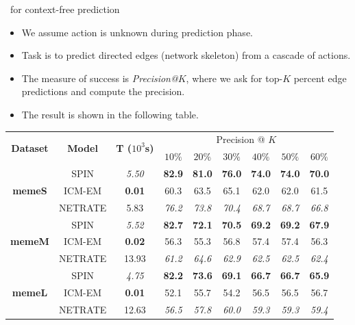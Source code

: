 \documentclass[first=dgreen,second=purple,logo=yellowexc]{aaltoslides}
\begin{document}
\begin{frame}{\spin\ for context-free prediction}
	\begin{itemize}
		\item We assume action is unknown during prediction phase.
		\item Task is to predict directed edges (network skeleton) from a cascade of actions.
		\item The measure of success is {\em Precision@$K$}, where we ask for top-$K$ percent edge predictions and compute the precision.
		\item The result is shown in the following table.
	\end{itemize}
			\begin{table}[t]
			\scriptsize
			\centering
			\begin{tabular}{|@{  }c@{  }|@{  }c@{  }|@{  }c@{  }|@{  }c@{  }|@{  }c@{  }|@{  }c@{  }|@{  }c@{  }|@{  }c@{  }|@{  }c@{  }|}
			  \hline
			\multirow{2}{*}{\textbf{Dataset}} & \multirow{2}{*}{\textbf{Model}} & \multirow{2}{*}{\textbf{T ({\tiny$10^3$s})}} & \multicolumn{6}{c|}{Precision @ $K$} \\ \cline{4-9}
			 & & & {$10\%$} & {$20\%$} & {$30\%$} & {$40\%$} & {$50\%$} & {$60\%$} \\ \hline
			\multirow{3}{*}{\textbf{memeS}}
			& SPIN & \em{5.50} & \textbf{82.9} & \textbf{81.0} & \textbf{76.0} & \textbf{74.0} & \textbf{74.0} & \textbf{70.0}  \\  
			& ICM-EM & \textbf{0.01} & {60.3} & {63.5} & {65.1} & {62.0} & {62.0} & {61.5}  \\ 
			& NETRATE & {5.83} & \em{76.2} & \em{73.8} & \em{70.4} & \em{68.7} & \em{68.7} & \em{66.8} \\ \hline 
			\multirow{3}{*}{\textbf{memeM}}
			& SPIN & \em{5.52} & \textbf{82.7} & \textbf{72.1} & \textbf{70.5} & \textbf{69.2} & \textbf{69.2} & \textbf{67.9}  \\  
			& ICM-EM & \textbf{0.02} & {56.3} & {55.3} & {56.8} & {57.4} & {57.4} & {56.3}  \\ 
			& NETRATE & {13.93} & \em{61.2} & \em{64.6} & \em{62.9} & \em{62.5} & \em{62.5} & \em{62.4}  \\ \hline 
			\multirow{3}{*}{\textbf{memeL}}
			& SPIN & \em{4.75} & \textbf{82.2} & \textbf{73.6} & \textbf{69.1} & \textbf{66.7} & \textbf{66.7} & \textbf{65.9}  \\  
			& ICM-EM & \textbf{0.01} & {52.1} & {55.7} & {54.2} & {56.5} & {56.5} & {56.7}  \\ 
			& NETRATE & {12.63} & \em{56.5} & \em{57.8} & \em{60.0} & \em{59.3} & \em{59.3} & \em{59.4}  \\ \hline
			\end{tabular}
			\end{table}
\end{frame}
\end{document}
